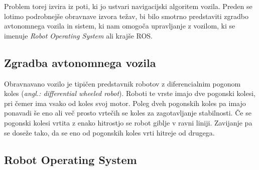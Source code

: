 \documentclass[10pt,a4paper]{article}
\begin{document}
Problem torej izvira iz poti, ki jo ustvari navigacijski algoritem vozila. Preden se lotimo podrobnejše obravnave izvora težav, bi bilo smotrno predstaviti zgradbo avtonomnega vozila in sistem, ki nam omogoča upravljanje z vozilom, ki se imenuje \textit{Robot Operating System} ali krajše ROS.

\subsection{Zgradba avtonomnega vozila}

Obravnavano vozilo je tipičen predstavnik robotov z diferencialnim pogonom koles (\textit{angl.: differential wheeled robot}).
Roboti te vrste imajo dve pogonski kolesi, pri čemer ima vsako od koles svoj motor. Poleg dveh pogonskih koles pa imajo ponavadi še eno ali več prosto vrtečih se koles za zagotavljanje stabilnosti. Če se pogonski kolesi vrtita z enako hitrostjo se robot giblje v ravni liniji. Zavijanje pa se doseže tako, da se eno od pogonskih koles vrti hitreje od drugega. %


\subsection{Robot Operating System}
\end{document}
